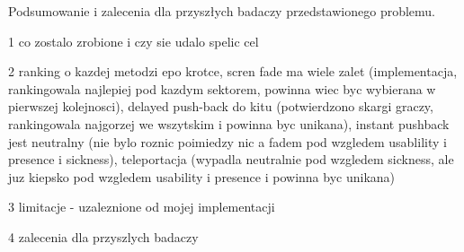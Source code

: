 Podsumowanie i zalecenia dla przyszłych badaczy przedstawionego problemu.

1 co zostalo zrobione i czy sie udalo spelic cel

2 ranking o kazdej metodzi epo krotce, scren fade ma wiele zalet (implementacja, rankingowala najlepiej pod kazdym sektorem, powinna wiec byc wybierana w pierwszej kolejnosci), delayed push-back do kitu (potwierdzono skargi graczy, rankingowala najgorzej we wszytskim i powinna byc unikana), instant pushback jest neutralny (nie bylo roznic poimiedzy nic a fadem pod wzgledem usablility i presence i sickness), teleportacja (wypadla neutralnie pod wzgledem sickness, ale juz kiepsko pod wzgledem usability i presence i powinna byc unikana)

3 limitacje - uzaleznione od mojej implementacji

4 zalecenia dla przyszlych badaczy
